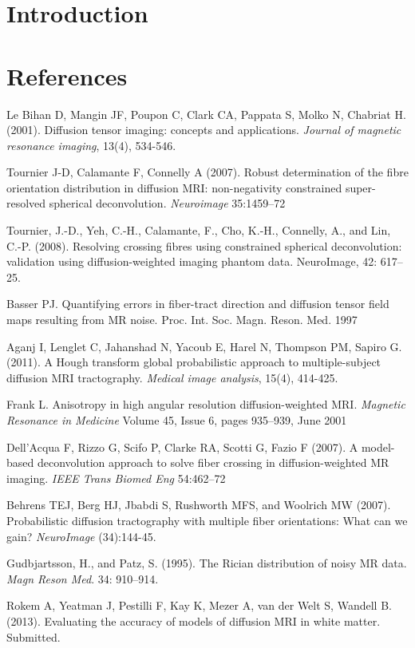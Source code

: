 \documentclass[11pt]{article}
\begin{document}
\section{Introduction}


\section{References}

Le Bihan D, Mangin JF, Poupon C, Clark CA, Pappata
S, Molko N, Chabriat H. (2001). Diffusion tensor imaging:
concepts and applications. \emph{Journal of magnetic resonance imaging},
13(4), 534-546.

Tournier J-D, Calamante F, Connelly A (2007). Robust determination of the
fibre orientation distribution in diffusion MRI: non-negativity constrained
super-resolved spherical deconvolution. {\it Neuroimage} 35:1459–72

Tournier, J.-D., Yeh, C.-H., Calamante, F., Cho, K.-H., Connelly, A., and
Lin, C.-P. (2008). Resolving crossing fibres using constrained spherical
deconvolution: validation using diffusion-weighted imaging phantom
data. NeuroImage, 42: 617–25.

Basser PJ. Quantifying errors in fiber-tract direction and diffusion tensor
field maps resulting from MR noise. Proc. Int. Soc. Magn. Reson. Med. 1997

Aganj I, Lenglet C, Jahanshad N, Yacoub E, Harel N, Thompson PM,
Sapiro G. (2011). A Hough transform global probabilistic approach to
multiple-subject diffusion MRI tractography. \emph{Medical image
  analysis}, 15(4), 414-425.

Frank L. Anisotropy in high angular resolution diffusion-weighted
MRI.  \emph{Magnetic Resonance in Medicine} Volume 45, Issue 6, pages
935–939, June 2001

Dell’Acqua F, Rizzo G, Scifo P, Clarke RA, Scotti G, Fazio F (2007). A
model-based deconvolution approach to solve fiber crossing in
diffusion-weighted MR imaging. {\it IEEE Trans Biomed Eng} 54:462–72

Behrens TEJ, Berg HJ, Jbabdi S, Rushworth MFS, and Woolrich MW (2007).  Probabilistic
diffusion tractography with multiple fiber orientations: What can we
gain?  {\it NeuroImage} (34):144-45.

Gudbjartsson, H., and Patz, S. (1995). The Rician distribution of noisy MR
data. {\it Magn Reson Med}. 34: 910–914.

Rokem A, Yeatman J, Pestilli F, Kay K, Mezer A, van der Welt S,
Wandell B.  (2013). Evaluating the accuracy of models of diffusion MRI
in white matter.  Submitted.
\end{document}
